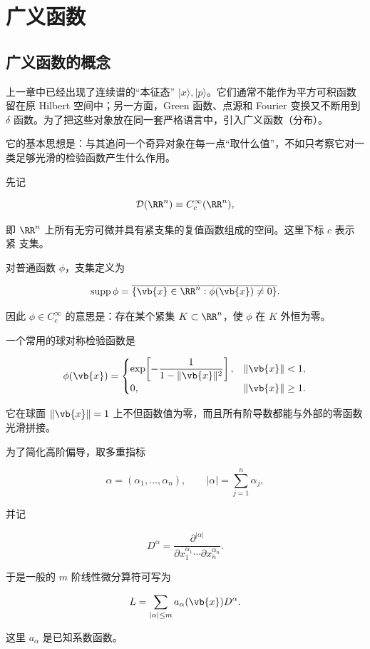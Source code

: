 \chapter{广义函数} \label{chap:math-distributions}
\label{chap:distributions-fourier}

\section{广义函数的概念}
\label{sec:distribution-concept}

上一章中已经出现了连续谱的``本征态'' $|x\rangle,|p\rangle$。它们通常不能作为平方可积函数留在原 Hilbert 空间中；另一方面，Green 函数、点源和 Fourier 变换又不断用到 $\delta$ 函数。为了把这些对象放在同一套严格语言中，引入广义函数（分布）。

它的基本思想是：与其追问一个奇异对象在每一点``取什么值''，不如只考察它对一类足够光滑的检验函数产生什么作用。

先记

\[
\mathcal D(\RR^n)\equiv C_c^\infty(\RR^n),
\]

即 $\RR^n$ 上所有无穷可微并具有紧支集的复值函数组成的空间。这里下标 $c$ 表示 紧 支集。

对普通函数 $\phi$，支集定义为

\[
\operatorname{supp}\phi
=\overline{\{\vb{x}\in\RR^n:\phi(\vb{x})\neq0\}}.
\]

因此 $\phi\in C_c^\infty$ 的意思是：存在某个紧集 $K\subset\RR^n$，使 $\phi$ 在 $K$ 外恒为零。

一个常用的球对称检验函数是

\[
\phi(\vb{x})=
\begin{cases}
\exp\!\left[-\dfrac1{1-\|\vb{x}\|^2}\right],&\|\vb{x}\|<1,\\[4pt]
0,&\|\vb{x}\|\ge1.
\end{cases}
\]

它在球面 $\|\vb{x}\|=1$ 上不但函数值为零，而且所有阶导数都能与外部的零函数光滑拼接。

为了简化高阶偏导，取多重指标

\[
\alpha=(\alpha_1,\ldots,\alpha_n),\qquad
|\alpha|=\sum_{j=1}^n\alpha_j,
\]

并记

\[
D^\alpha
=\frac{\partial^{|\alpha|}}
{\partial x_1^{\alpha_1}\cdots\partial x_n^{\alpha_n}}.
\]

于是一般的 $m$ 阶线性微分算符可写为

\[
L=\sum_{|\alpha|\le m}a_\alpha(\vb{x})D^\alpha.
\]

这里 $a_\alpha$ 是已知系数函数。

